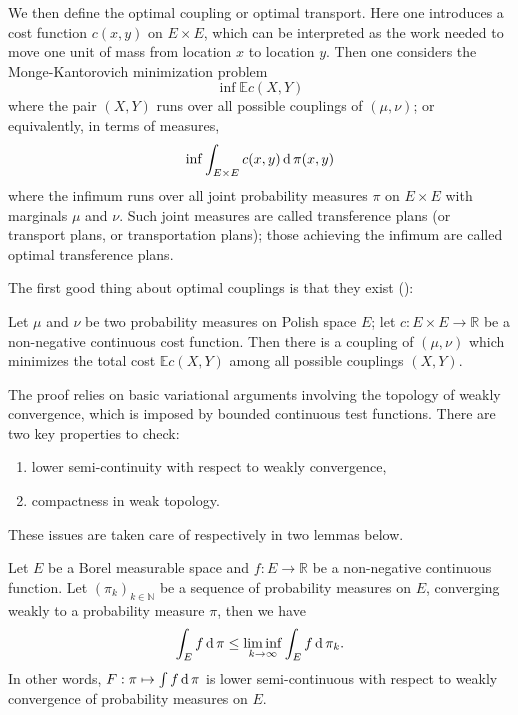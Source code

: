 We then define the optimal coupling or optimal transport.
Here one introduces a cost function \( c ( x , y ) \) on \( E \times E \),
which can be interpreted as the work needed to move one unit of mass from location \( x \) to location \( y \).
Then one considers the Monge-Kantorovich minimization problem
\[
	\inf  \mathbb{ E } c ( X , Y )
\]
where the pair \( ( X , Y ) \) runs over all possible couplings of \( ( \mu , \nu ) \);
or equivalently, in terms of measures,
\[ \inf \int _ { E \times E } c ( x , y ) \operatorname{d} \pi ( x , y ) \]
where the infimum runs over all joint probability measures \( \pi \) on \( E \times E \) with marginals \( \mu \) and \( \nu \).
Such joint measures are called transference plans (or transport plans, or transportation plans);
those achieving the infimum are called optimal transference plans.

The first good thing about optimal couplings is that they exist (\cite[Theorem 4.1]{villani2008optimal}):
\begin{thm}
	\label{thm:existence_optimal_coupling}
	Let \(  \mu \) and \(  \nu  \) be two probability measures on Polish space $E$;
	let \( c: E \times E \rightarrow \mathbb{ R }  \) be
	a non-negative continuous cost function.
	Then there is a coupling of \( ( \mu , \nu ) \) which minimizes the total cost \( \mathbb{ E } c ( X , Y ) \) among all possible couplings \( ( X , Y ) \).
\end{thm}

The proof relies on basic variational arguments involving the topology of weakly convergence,
which is imposed by bounded continuous test functions.
There are two key properties to check:
\begin{enumerate}
	\item lower semi-continuity with respect to weakly convergence,
	\item compactness in weak topology.
\end{enumerate}
These issues are taken care of respectively in two lemmas below.

\begin{lem}
	\label{lem:lower_semi-continuity_of_the_cost_functional}
	Let \( E \) be a Borel measurable space
	and \( f : E  \rightarrow \mathbb{ R }\) be a non-negative continuous function.
	Let \( \left( \pi _ { k } \right) _ { k \in \mathbb{ N } } \) be a sequence of
	probability measures on \( E \),
	converging weakly to a probability measure \( \pi \),
	then we have
	\[
		\int _ { E } f \operatorname{d} \pi \leq \liminf _ { k \rightarrow \infty } \int _ { E } f \operatorname{d} \pi _ { k }.
	\]
	In other words, \( F: \pi \mapsto \int f \operatorname{d} \pi \) is lower semi-continuous
	with respect to weakly convergence of probability measures on $E$.
\end{lem}

